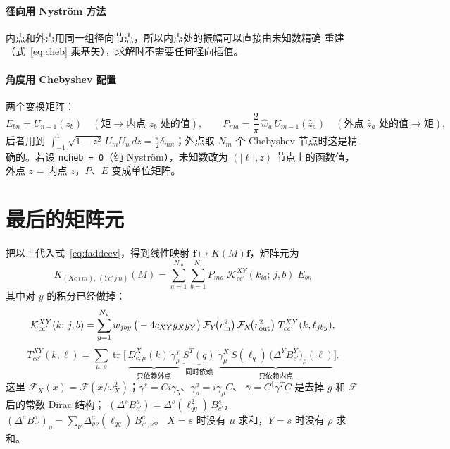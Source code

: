 \documentclass[11pt,a4paper]{ctexart}
\newcommand{\tr}{\operatorname{tr}}
\newcommand{\lQ}{\ell_q}
\newcommand{\lQQ}{\ell_{qq}}
\newcommand{\code}[1]{\texttt{#1}}
\begin{document}
\paragraph{径向用 Nystr\"om 方法} 内点和外点用同一组径向节点，所以内点处的振幅可以直接由未知数精确
重建（式~\eqref{eq:cheb} 乘基矢），求解时不需要任何径向插值。

\paragraph{角度用 Chebyshev 配置} 两个变换矩阵：
\begin{equation}\label{eq:PE}
E_{bn}=U_{n-1}(z_b)\quad(\text{矩}\to\text{内点 }z_b\text{ 处的值}),\qquad
P_{ma}=\frac{2}{\pi}\,\hat w_a\,U_{m-1}(\hat z_a)\quad(\text{外点 }\hat z_a\text{ 处的值}\to\text{矩}),
\end{equation}
后者用到 $\int_{-1}^{1}\sqrt{1-z^2}\,U_mU_n\,dz=\tfrac{\pi}{2}\delta_{mn}$；外点取 $N_m$ 个 Chebyshev
节点时这是精确的。若设 \code{ncheb = 0}（纯 Nystr\"om），未知数改为 $(|\ell|,z)$ 节点上的函数值，
外点 $z$ = 内点 $z$，$P$、$E$ 变成单位矩阵。

\section{最后的矩阵元}

把以上代入式~\eqref{eq:faddeev}，得到线性映射 $\boldsymbol f\mapsto K(M)\boldsymbol f$，矩阵元为
\begin{equation}\label{eq:K}
\boxed{\;
K_{(X c\, i\, m),\,(Y c'\, j\, n)}(M)=\sum_{a=1}^{N_m}\sum_{b=1}^{N_z} P_{ma}\;
\mathcal K^{XY}_{cc'}(k_{ia};\,j,b)\;E_{bn}\;}
\end{equation}
其中对 $y$ 的积分已经做掉：
\begin{equation}\label{eq:Kfull}
\mathcal K^{XY}_{cc'}(k;\,j,b)=\sum_{y=1}^{N_y} w_{jby}\,
\big(-4c_{XY}g_Xg_Y\big)\,
\mathcal F_Y\!\big(r_{\rm in}^2\big)\,\mathcal F_X\!\big(r_{\rm out}^2\big)\;
T^{XY}_{cc'}(k,\ell_{jby}),
\end{equation}
\begin{equation}\label{eq:T}
T^{XY}_{cc'}(k,\ell)=\sum_{\mu,\rho}\tr\Big[\,
\underbrace{D^X_{c,\mu}(k)\,\gamma^Y_{\rho}}_{\text{只依赖外点}}\;
\underbrace{S^{T}(q)}_{\text{同时依赖}}\;
\underbrace{\bar\gamma^X_{\mu}\,S(\lQ)\,\big(\Delta^YB^Y_{c'}\big)_\rho(\ell)}_{\text{只依赖内点}}
\Big].
\end{equation}
这里 $\mathcal F_X(x)=\mathcal F(x/\omega_X^2)$；$\gamma^s=Ci\gamma_5$、$\gamma^a_\rho=i\gamma_\rho C$、
$\bar\gamma=C^\dagger\gamma^TC$ 是去掉 $g$ 和 $\mathcal F$ 后的常数 Dirac 结构；
$(\Delta^sB^s_{c'})=\Delta^s(\lQQ^2)\,B^s_{c'}$，
$(\Delta^aB^a_{c'})_\rho=\sum_\nu\Delta^a_{\rho\nu}(\lQQ)\,B^a_{c',\nu}$。
$X=s$ 时没有 $\mu$ 求和，$Y=s$ 时没有 $\rho$ 求和。
\end{document}
